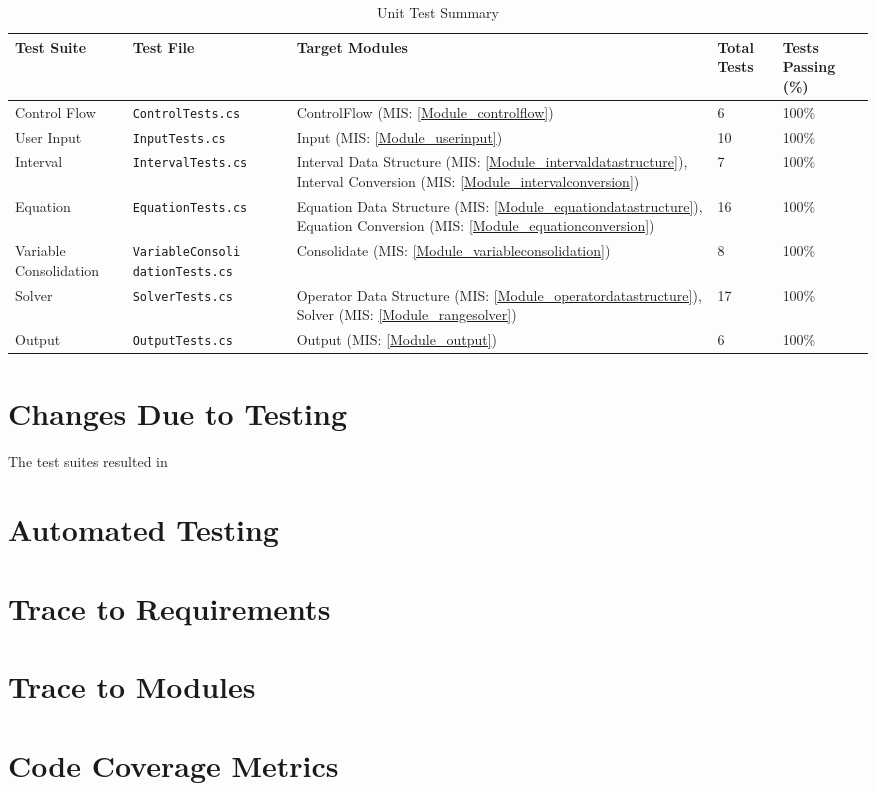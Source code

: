 \documentclass[12pt, titlepage]{article}
\newcommand{\misref}[1]{MIS: \ref{#1}}
\begin{document}
\begin{center}
		\begin{longtable}{ | p{2.5cm} | p{4cm} | p{2.5cm} | m{1cm} | m{1.5cm} 
		|}
		\caption{Unit Test Summary} \\ \hline \label{TblUnitTests} 
		\textbf{Test Suite} & \textbf{Test File} & \textbf{Target Modules} & 
		\textbf{Total Tests} & 
		\textbf{Tests Passing (\%)}  \\ 
		\hline
		Control Flow & \texttt{ControlTests.cs} & ControlFlow 
		(\misref{Module_controlflow}) & 6 & 100\% \\ 
		\hline
		
		User Input & \texttt{InputTests.cs} &Input (\misref{Module_userinput}) 
		& 10 & 100\% \\ \hline
		
		Interval & \texttt{IntervalTests.cs} &Interval Data Structure 
		(\misref{Module_intervaldatastructure}), Interval Conversion 
		(\misref{Module_intervalconversion}) & 7 & 100\% \\ \hline
		
		Equation & \texttt{EquationTests.cs} &Equation Data Structure 
		(\misref{Module_equationdatastructure}), Equation Conversion 
		(\misref{Module_equationconversion}) & 16 & 100\% \\ \hline
		
		Variable Consolidation & \texttt{VariableConsoli dationTests.cs} & 
		Consolidate 
		(\misref{Module_variableconsolidation}) & 8 & 100\% \\ \hline
		
		Solver &\texttt{SolverTests.cs} & Operator Data Structure 
		(\misref{Module_operatordatastructure}), Solver 
		(\misref{Module_rangesolver}) & 17 & 100\% \\ \hline
		
		Output & \texttt{OutputTests.cs} &Output (\misref{Module_output}) & 6 & 
		100\% \\ \hline
	\end{longtable}
\end{center}

\section{Changes Due to Testing}
The test suites resulted in 

\section{Automated Testing}
		
\section{Trace to Requirements}
		
\section{Trace to Modules}		

\section{Code Coverage Metrics}
\end{document}
